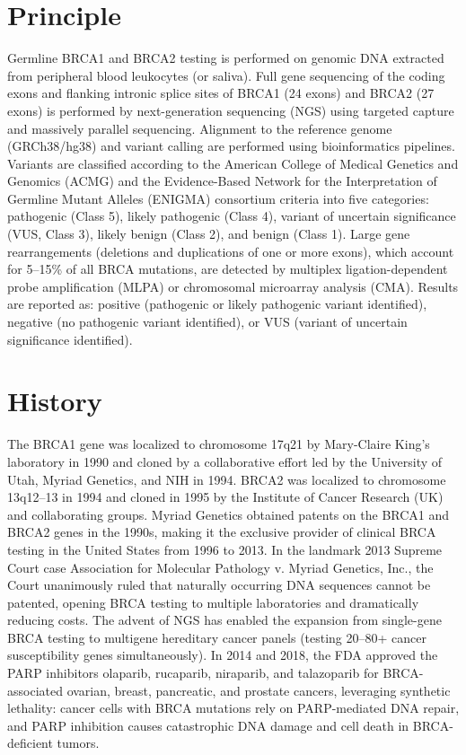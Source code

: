 \section*{Principle}
Germline BRCA1 and BRCA2 testing is performed on genomic DNA extracted from peripheral blood leukocytes (or saliva). Full gene sequencing of the coding exons and flanking intronic splice sites of BRCA1 (24 exons) and BRCA2 (27 exons) is performed by next-generation sequencing (NGS) using targeted capture and massively parallel sequencing. Alignment to the reference genome (GRCh38/hg38) and variant calling are performed using bioinformatics pipelines. Variants are classified according to the American College of Medical Genetics and Genomics (ACMG) and the Evidence-Based Network for the Interpretation of Germline Mutant Alleles (ENIGMA) consortium criteria into five categories: pathogenic (Class 5), likely pathogenic (Class 4), variant of uncertain significance (VUS, Class 3), likely benign (Class 2), and benign (Class 1). Large gene rearrangements (deletions and duplications of one or more exons), which account for 5--15\% of all BRCA mutations, are detected by multiplex ligation-dependent probe amplification (MLPA) or chromosomal microarray analysis (CMA). Results are reported as: positive (pathogenic or likely pathogenic variant identified), negative (no pathogenic variant identified), or VUS (variant of uncertain significance identified).

\section*{History}
The BRCA1 gene was localized to chromosome 17q21 by Mary-Claire King's laboratory in 1990 and cloned by a collaborative effort led by the University of Utah, Myriad Genetics, and NIH in 1994. BRCA2 was localized to chromosome 13q12--13 in 1994 and cloned in 1995 by the Institute of Cancer Research (UK) and collaborating groups. Myriad Genetics obtained patents on the BRCA1 and BRCA2 genes in the 1990s, making it the exclusive provider of clinical BRCA testing in the United States from 1996 to 2013. In the landmark 2013 Supreme Court case Association for Molecular Pathology v. Myriad Genetics, Inc., the Court unanimously ruled that naturally occurring DNA sequences cannot be patented, opening BRCA testing to multiple laboratories and dramatically reducing costs. The advent of NGS has enabled the expansion from single-gene BRCA testing to multigene hereditary cancer panels (testing 20--80+ cancer susceptibility genes simultaneously). In 2014 and 2018, the FDA approved the PARP inhibitors olaparib, rucaparib, niraparib, and talazoparib for BRCA-associated ovarian, breast, pancreatic, and prostate cancers, leveraging synthetic lethality: cancer cells with BRCA mutations rely on PARP-mediated DNA repair, and PARP inhibition causes catastrophic DNA damage and cell death in BRCA-deficient tumors.

